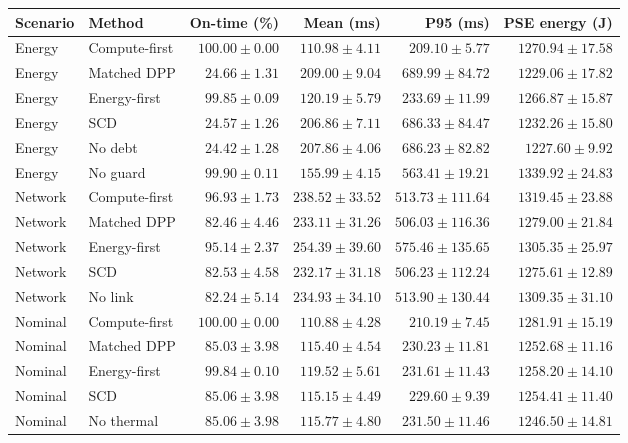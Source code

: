 \begin{tabular}{@{}llrrrr@{}}
\toprule
Scenario & Method & On-time (\%) & Mean (ms) & P95 (ms) & PSE energy (J)\\
\midrule
Energy & Compute-first & $100.00\pm0.00$ & $110.98\pm4.11$ & $209.10\pm5.77$ & $1270.94\pm17.58$\\
Energy & Matched DPP & $24.66\pm1.31$ & $209.00\pm9.04$ & $689.99\pm84.72$ & $1229.06\pm17.82$\\
Energy & Energy-first & $99.85\pm0.09$ & $120.19\pm5.79$ & $233.69\pm11.99$ & $1266.87\pm15.87$\\
Energy & SCD & $24.57\pm1.26$ & $206.86\pm7.11$ & $686.33\pm84.47$ & $1232.26\pm15.80$\\
Energy & No debt & $24.42\pm1.28$ & $207.86\pm4.06$ & $686.23\pm82.82$ & $1227.60\pm9.92$\\
Energy & No guard & $99.90\pm0.11$ & $155.99\pm4.15$ & $563.41\pm19.21$ & $1339.92\pm24.83$\\
Network & Compute-first & $96.93\pm1.73$ & $238.52\pm33.52$ & $513.73\pm111.64$ & $1319.45\pm23.88$\\
Network & Matched DPP & $82.46\pm4.46$ & $233.11\pm31.26$ & $506.03\pm116.36$ & $1279.00\pm21.84$\\
Network & Energy-first & $95.14\pm2.37$ & $254.39\pm39.60$ & $575.46\pm135.65$ & $1305.35\pm25.97$\\
Network & SCD & $82.53\pm4.58$ & $232.17\pm31.18$ & $506.23\pm112.24$ & $1275.61\pm12.89$\\
Network & No link & $82.24\pm5.14$ & $234.93\pm34.10$ & $513.90\pm130.44$ & $1309.35\pm31.10$\\
Nominal & Compute-first & $100.00\pm0.00$ & $110.88\pm4.28$ & $210.19\pm7.45$ & $1281.91\pm15.19$\\
Nominal & Matched DPP & $85.03\pm3.98$ & $115.40\pm4.54$ & $230.23\pm11.81$ & $1252.68\pm11.16$\\
Nominal & Energy-first & $99.84\pm0.10$ & $119.52\pm5.61$ & $231.61\pm11.43$ & $1258.20\pm14.10$\\
Nominal & SCD & $85.06\pm3.98$ & $115.15\pm4.49$ & $229.60\pm9.39$ & $1254.41\pm11.40$\\
Nominal & No thermal & $85.06\pm3.98$ & $115.77\pm4.80$ & $231.50\pm11.46$ & $1246.50\pm14.81$\\
\bottomrule
\end{tabular}
